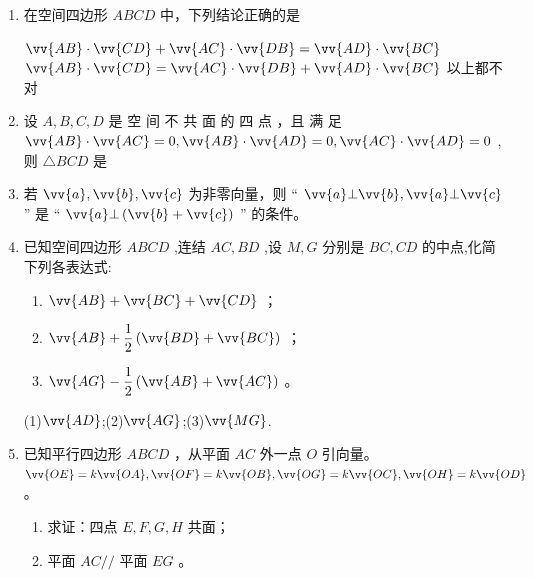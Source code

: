 \begin{enumerate}
\item 在空间四边形 ${ABCD}$ 中，下列结论正确的是

{$\vv{AB} \cdot  \vv{CD} + \vv{AC} \cdot  \vv{DB} = \vv{AD} \cdot  \vv{BC}$}
{$\vv{AB} \cdot  \vv{CD} = \vv{AC} \cdot  \vv{DB} + \vv{AD} \cdot  \vv{BC}$ }
{以上都不对}

\item 设 $A,B,C,D$ 是 空 间 不 共 面 的 四 点 ，且 满 足 $\vv{AB} \cdot  \vv{AC} = 0,\vv{AB} \cdot  \vv{AD} = 0,\vv{AC} \cdot  \vv{AD} = 0$ ,则 $\bigtriangleup  {BCD}$ 是 



\item 若 $\vv{a},\vv{b},\vv{c}$ 为非零向量，则 “ $\vv{a}\bot \vv{b},\vv{a}\bot \vv{c}$ ” 是 “ $\vv{a}\bot \left( {\vv{b} + \vv{c}}\right)$ ” 的条件。


\item 已知空间四边形 ${ABCD}$ ,连结 ${AC},{BD}$ ,设 $M,G$ 分别是 ${BC},{CD}$ 的中点,化简下列各表达式:
\begin{enumerate}
    \item $\vv{AB} + \vv{BC} + \vv{CD}$ ；
    \item $\vv{AB} + \dfrac{1}{2}\left( {\vv{BD} + \vv{BC}}\right)$ ； 
    \item $\vv{AG} - \dfrac{1}{2}\left( {\vv{AB} + \vv{AC}}\right)$ 。
\end{enumerate}
\begin{jieda}
    (1)$\vv{AD}$;(2)$\vv{AG}$;(3)$\vv{MG}$.
\end{jieda}


\item 已知平行四边形 ${ABCD}$ ，从平面 ${AC}$ 外一点 $O$ 引向量。 $\vv{OE} = k\vv{OA},\vv{OF} = k\vv{OB},\vv{OG} = k\vv{OC},\vv{OH} = k\vv{OD}$ 。
\begin{enumerate}
    \item 求证：四点 $E,F,G,H$ 共面；
    \item 平面 ${AC}//$ 平面 ${EG}$ 。
\end{enumerate}


\end{enumerate}
